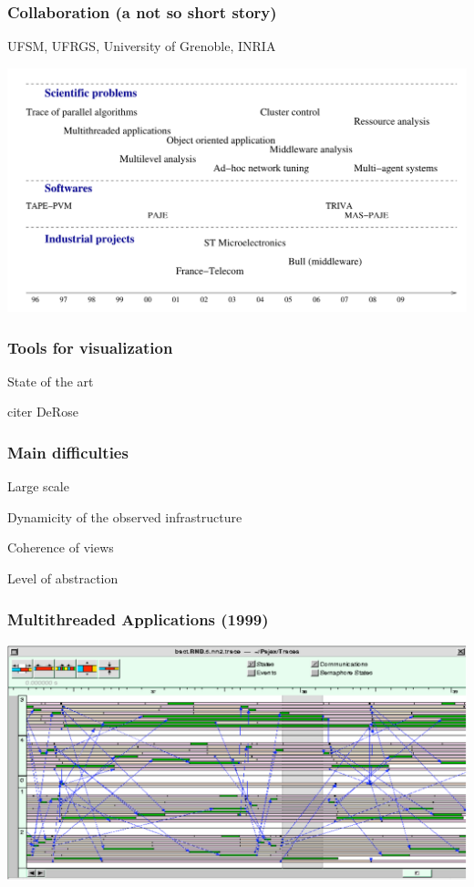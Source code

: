 \begin{frame}

\frametitle{Collaboration (a not so short story)}
\begin{center}\large{UFSM, UFRGS, University of Grenoble, INRIA}\end{center}
\includegraphics[width=1.1\textwidth]{img/collaboration.pdf}
\end{frame}


\begin{frame}
\frametitle{Tools for visualization}
State of the art

citer DeRose
\end{frame}

\begin{frame}
\frametitle{Main difficulties}
\begin{description}
\item Large scale
\item 
\item Dynamicity of the observed infrastructure
\item Coherence of views
\item Level of abstraction
\end{description}
\end{frame}

\begin{frame}
\frametitle{Multithreaded Applications (1999)}
\includegraphics[width=\textwidth]{figures/Multithreaded.pdf}

\end{frame}


